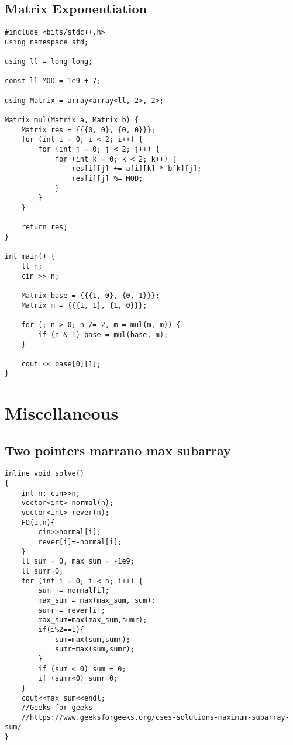 \documentclass{article}
\begin{document}
\subsection{Matrix Exponentiation}
\begin{lstlisting}
#include <bits/stdc++.h>
using namespace std;

using ll = long long;

const ll MOD = 1e9 + 7;

using Matrix = array<array<ll, 2>, 2>;

Matrix mul(Matrix a, Matrix b) {
	Matrix res = {{{0, 0}, {0, 0}}};
	for (int i = 0; i < 2; i++) {
		for (int j = 0; j < 2; j++) {
			for (int k = 0; k < 2; k++) {
				res[i][j] += a[i][k] * b[k][j];
				res[i][j] %= MOD;
			}
		}
	}

	return res;
}

int main() {
	ll n;
	cin >> n;

	Matrix base = {{{1, 0}, {0, 1}}};
	Matrix m = {{{1, 1}, {1, 0}}};

	for (; n > 0; n /= 2, m = mul(m, m)) {
		if (n & 1) base = mul(base, m);
	}

	cout << base[0][1];
}
\end{lstlisting}

\section{Miscellaneous}
\subsection{Two pointers marrano max subarray}
\begin{lstlisting}
inline void solve()
{
    int n; cin>>n;
    vector<int> normal(n);
    vector<int> rever(n);
    FO(i,n){
        cin>>normal[i];
        rever[i]=-normal[i];
    }
    ll sum = 0, max_sum = -1e9;
    ll sumr=0;
    for (int i = 0; i < n; i++) {
        sum += normal[i];
        max_sum = max(max_sum, sum);
        sumr+= rever[i];
        max_sum=max(max_sum,sumr);
        if(i%2==1){
            sum=max(sum,sumr);
            sumr=max(sum,sumr);
        }
        if (sum < 0) sum = 0;
        if (sumr<0) sumr=0;
    }
    cout<<max_sum<<endl;
    //Geeks for geeks
    //https://www.geeksforgeeks.org/cses-solutions-maximum-subarray-sum/
}
\end{lstlisting}
\end{document}
